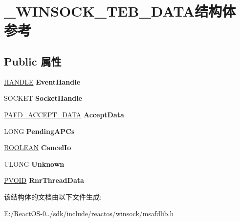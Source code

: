 \hypertarget{struct___w_i_n_s_o_c_k___t_e_b___d_a_t_a}{}\section{\+\_\+\+W\+I\+N\+S\+O\+C\+K\+\_\+\+T\+E\+B\+\_\+\+D\+A\+T\+A结构体 参考}
\label{struct___w_i_n_s_o_c_k___t_e_b___d_a_t_a}
\subsection*{Public 属性}
\begin{DoxyCompactItemize}
\item 
\mbox{\label{struct___w_i_n_s_o_c_k___t_e_b___d_a_t_a_a01f9ec5376a5d38bcb4ea7ee038c40bc}} 
\hyperlink{interfacevoid}{H\+A\+N\+D\+LE} {\bfseries Event\+Handle}
\item 
\mbox{\label{struct___w_i_n_s_o_c_k___t_e_b___d_a_t_a_ae23b429b5398d11e6586b5434bc3f515}} 
S\+O\+C\+K\+ET {\bfseries Socket\+Handle}
\item 
\mbox{\label{struct___w_i_n_s_o_c_k___t_e_b___d_a_t_a_a05413e462804080df7511faa46df140f}} 
\hyperlink{struct___a_f_d___a_c_c_e_p_t___d_a_t_a}{P\+A\+F\+D\+\_\+\+A\+C\+C\+E\+P\+T\+\_\+\+D\+A\+TA} {\bfseries Accept\+Data}
\item 
\mbox{\label{struct___w_i_n_s_o_c_k___t_e_b___d_a_t_a_abec0d37d3dcfada54f1aaa16e791283a}} 
L\+O\+NG {\bfseries Pending\+A\+P\+Cs}
\item 
\mbox{\label{struct___w_i_n_s_o_c_k___t_e_b___d_a_t_a_a86b1c50016b44a1c5e69a65acff165c5}} 
\hyperlink{_processor_bind_8h_a112e3146cb38b6ee95e64d85842e380a}{B\+O\+O\+L\+E\+AN} {\bfseries Cancel\+Io}
\item 
\mbox{\label{struct___w_i_n_s_o_c_k___t_e_b___d_a_t_a_a219eff17aabd2353ab8651ee33880a70}} 
U\+L\+O\+NG {\bfseries Unknown}
\item 
\mbox{\label{struct___w_i_n_s_o_c_k___t_e_b___d_a_t_a_a7996aa99f068c20f63dab2e8d1e2eef5}} 
\hyperlink{interfacevoid}{P\+V\+O\+ID} {\bfseries Rnr\+Thread\+Data}
\end{DoxyCompactItemize}


该结构体的文档由以下文件生成\+:\begin{DoxyCompactItemize}
\item 
E\+:/\+React\+O\+S-\/0../sdk/include/reactos/winsock/msafdlib.\+h\end{DoxyCompactItemize}
